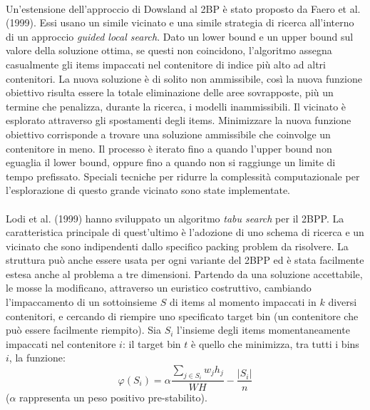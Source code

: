 \documentclass[12pt,a4paper,openright,twoside]{report}
\begin{document}
\\Un'estensione dell'approccio di Dowsland al 2BP \`{e} stato proposto da Faero et al. (1999). Essi usano un simile vicinato e una simile strategia di ricerca all'interno di un approccio \textit{guided local search}. Dato un lower bound e un upper bound sul valore della soluzione ottima, se questi non coincidono, l'algoritmo assegna casualmente gli items impaccati nel contenitore di indice pi\`{u} alto ad altri contenitori. La nuova soluzione \`{e} di solito non ammissibile, cos\`{i} la nuova funzione obiettivo risulta essere la totale eliminazione delle aree sovrapposte, pi\`{u} un termine che penalizza, durante la ricerca, i modelli inammissibili. Il vicinato \`{e} esplorato attraverso gli spostamenti degli items. Minimizzare la nuova funzione obiettivo corrisponde a trovare una soluzione ammissibile che coinvolge un contenitore in meno. Il processo \`{e} iterato fino a quando l'upper bound non eguaglia il lower bound, oppure fino a quando non si raggiunge un limite di tempo prefissato. Speciali tecniche per ridurre la complessit\`{a} computazionale per l'esplorazione di questo grande vicinato sono state implementate.\\
\\Lodi et al. (1999) hanno sviluppato un algoritmo \textit{tabu search} per il 2BPP. La caratteristica principale di quest'ultimo \`{e} l'adozione di uno schema di ricerca e un vicinato che sono indipendenti dallo specifico packing problem da risolvere. La struttura pu\`{o} anche essere usata per ogni variante del 2BPP ed \`{e} stata facilmente estesa anche al problema a tre dimensioni. Partendo da una soluzione accettabile, le mosse la modificano, attraverso un euristico costruttivo, cambiando l'impaccamento di un sottoinsieme $S$ di items al momento impaccati in $k$ diversi contenitori, e cercando di riempire uno specificato target bin (un contenitore che pu\`{o} essere facilmente riempito). Sia $S_{i}$ l'insieme degli items momentaneamente impaccati nel contenitore $i$: il target bin $t$ \`{e} quello che minimizza, tra tutti i bins $i$, la funzione:
$$ \varphi (S_{i}) = \alpha \dfrac{\sum_{j \in S_{i}} w_{j}h_{j} } {WH} - \dfrac{\vert S_{i} \vert}{n}$$
($\alpha$ rappresenta un peso positivo pre-stabilito).
\end{document}
